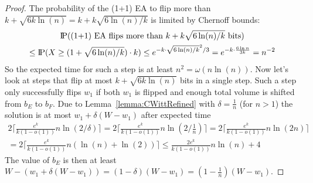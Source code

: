 \begin{proof}
    




    The probability of the (1+1) EA to flip more than $k+\sqrt{6k\ln(n)}=k+k\sqrt{6\ln(n)/k}$ is limited by Chernoff bounds:
    \begin{gather}
        \nonumber \text{I\kern-0.15em P}(\text{(1+1) EA flips more than }k+k\sqrt{6\ln(n)/k}\text{ bits})\\ \nonumber
        \le\text{I\kern-0.15em P}(X\ge (1+\sqrt{6\ln(n)/k})\cdot k)
        \le e^{-k\cdot{\sqrt{6\ln(n)/k}}^2/3}
        = e^{-k\cdot \frac{6\ln n}{3k}}
        = n^{-2}
    \end{gather}
    So the expected time for such a step is at least \(n^2=\omega(n\ln(n))\).
    Now let's look at steps that flip at most $k+\sqrt{6k\ln(n)}$ bits in a single step.
    Such a step only successfully flips $w_1$ if both $w_1$ is flipped and enough total volume is shifted from $b_E$ to $b_F$.
    Due to Lemma~\ref{lemma:CWittRefined} with $\delta=\frac{1}{n}$ (for $n>1$) the solution is at most $w_1+\delta(W-w_1)$ after expected time
    \begin{gather}\nonumber
        2\lceil\frac{e^k}{k(1-o(1))}n\ln(2/\delta)\rceil
        =2\lceil\frac{e^k}{k(1-o(1))}n\ln(2/\frac{1}{n})\rceil
        =2\lceil\frac{e^k}{k(1-o(1))}n\ln(2n)\rceil \\ \nonumber
        =2\lceil\frac{e^k}{k(1-o(1))}n(\ln(n)+\ln(2))\rceil
        \le\frac{2e^k}{k(1-o(1))}n\ln(n)+4
    \end{gather}
    The value of $b_E$ is then at least \(W-(w_1+\delta(W-w_1))=(1-\delta)(W-w_1)=(1-\frac{1}{n})(W-w_1)\).


\end{proof}
